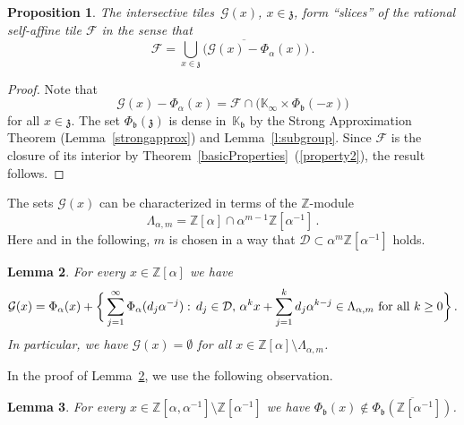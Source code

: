 \documentclass[12pt]{amsart}
\newtheorem{lemma}{Lemma}[section]
\newtheorem{proposition}[lemma]{Proposition}
\theoremstyle{definition}
\theoremstyle{remark}
\numberwithin{equation}{section}
\begin{document}
\begin{proposition} \label{p:slices}
The intersective tiles~$\mathcal{G}(x)$, $x \in \mathfrak{z}$, form ``slices'' of the rational self-affine tile $\mathcal{F}$ in the sense that
\[
\mathcal{F} = \overline{\bigcup_{x \in \mathfrak{z}} \big(\mathcal{G}(x) - \Phi_\alpha(x)\big)}\,.
\]
\end{proposition}

\begin{proof}
Note that
\[
\mathcal{G}(x) - \Phi_\alpha(x) = \mathcal{F} \cap \big(\mathbb{K}_\infty \times \Phi_\mathfrak{b}(-x)\big)
\]
for all $x \in \mathfrak{z}$.
The set $\Phi_\mathfrak{b}(\mathfrak{z})$ is dense in~$\mathbb{K}_\mathfrak{b}$ by the Strong Approximation Theorem (Lemma~\ref{strongapprox}) and Lemma~\ref{l:subgroup}.
Since $\mathcal{F}$ is the closure of its interior by Theorem~\ref{basicProperties}~(\ref{property2}), the result follows.
\end{proof}

The sets $\mathcal{G}(x)$ can be characterized in terms of the $\mathbb{Z}$-module
\[
\Lambda_{\alpha,m} = \mathbb{Z}[\alpha] \cap \alpha^{m-1} \mathbb{Z}[\alpha^{-1}]\,.
\]
Here and in the following, $m$ is chosen in a way that $\mathcal{D} \subset \alpha^{m}\mathbb{Z}[\alpha^{-1}]$ holds.

\begin{lemma} \label{l:G}
For every $x \in \mathbb{Z}[\alpha]$ we have
\[
\mathcal{G}(x) = \Phi_\alpha(x) + \bigg\{\sum_{j=1}^\infty \Phi_\alpha(d_j \alpha^{-j}):\, d_j \in \mathcal{D},\,  \alpha^k x + \sum_{j=1}^k d_j \alpha^{k-j} \in \Lambda_{\alpha,m}\ \hbox{for all}\ k\ge 0\bigg\}\,.
\]
In particular, we have $\mathcal{G}(x) = \emptyset$ for all $x \in \mathbb{Z}[\alpha] \setminus \Lambda_{\alpha,m}$.
\end{lemma}

In the proof of Lemma~\ref{l:G}, we use the following observation.

\begin{lemma} \label{l:boundedaway}
For every $x \in \mathbb{Z}[\alpha,\alpha^{-1}] \setminus \mathbb{Z}[\alpha^{-1}]$ we have $\Phi_\mathfrak{b}(x) \not\in \overline{\Phi_\mathfrak{b}(\mathbb{Z}[\alpha^{-1}])}$.
\end{lemma}
\end{document}

